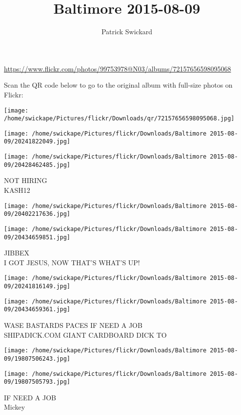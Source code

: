 \documentclass[10pt,letterpaper]{article}
\title{Baltimore 2015-08-09}
\author{Patrick Swickard}
\date{}
\begin{document}
\maketitle

\url{https://www.flickr.com/photos/99753978@N03/albums/72157656598095068}

Scan the QR code below to go to the original album with full-size photos on Flickr:

\texttt{[image: /home/swickape/Pictures/flickr/Downloads/qr/72157656598095068.jpg]}
\pagebreak

\texttt{[image: /home/swickape/Pictures/flickr/Downloads/Baltimore 2015-08-09/20241822049.jpg]}

\vspace{0.25in}
\texttt{[image: /home/swickape/Pictures/flickr/Downloads/Baltimore 2015-08-09/20428462485.jpg]}

NOT HIRING\\
KASH12
\pagebreak

\texttt{[image: /home/swickape/Pictures/flickr/Downloads/Baltimore 2015-08-09/20402217636.jpg]}

\vspace{0.25in}
\texttt{[image: /home/swickape/Pictures/flickr/Downloads/Baltimore 2015-08-09/20434659851.jpg]}

JIBBEX\\
I GOT JESUS, NOW THAT'S WHAT'S UP!
\pagebreak

\texttt{[image: /home/swickape/Pictures/flickr/Downloads/Baltimore 2015-08-09/20241816149.jpg]}

\vspace{0.25in}
\texttt{[image: /home/swickape/Pictures/flickr/Downloads/Baltimore 2015-08-09/20434659361.jpg]}

WASE BASTARDS PACES IF NEED A JOB\\
SHIPADICK.COM GIANT CARDBOARD DICK TO
\pagebreak

\texttt{[image: /home/swickape/Pictures/flickr/Downloads/Baltimore 2015-08-09/19807506243.jpg]}

\vspace{0.25in}
\texttt{[image: /home/swickape/Pictures/flickr/Downloads/Baltimore 2015-08-09/19807505793.jpg]}

IF NEED A JOB\\
Mickey
\pagebreak
\end{document}
